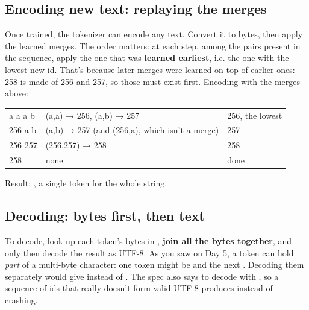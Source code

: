 \documentclass[10pt,a4paper]{article}
\begin{document}
\subsection{Encoding new text: replaying the merges}
Once trained, the tokenizer can encode any text. Convert it to bytes, then apply the learned merges. The order matters: at each step, among the pairs present in the sequence, apply the one that was \textbf{learned earliest}, i.e. the one with the lowest new id. That’s because later merges were learned on top of earlier ones: 258 is made of 256 and 257, so those must exist first.
Encoding  with the merges above:
\begin{datatable}{}{\small}
\begin{xltabular}{\linewidth}{@{}Y{0.44}Y{1.97}Y{0.59}@{}}
 &  &  \\ \hline
\endhead
a a a b & (a,a) → 256, (a,b) → 257 & 256, the lowest \\
256 a b & (a,b) → 257 (and (256,a), which isn’t a merge) & 257 \\
256 257 & (256,257) → 258 & 258 \\
258 & none & done \\
\hline
\end{xltabular}
\end{datatable}
Result: \code{[258]}, a single token for the whole string.
\subsection{Decoding: bytes first, then text}
To decode, look up each token’s bytes in , \textbf{join all the bytes together}, and only then decode the result as UTF-8. As you saw on Day 5, a token can hold \emph{part} of a multi-byte character: one token might be  and the next . Decoding them separately would give  instead of . The spec also says to decode with , so a sequence of ids that really doesn’t form valid UTF-8 produces  instead of crashing.
\end{document}

